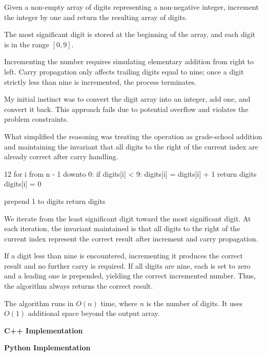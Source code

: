 
\label{prob:lc-066-plus-one}

\ProblemSummary
Given a non-empty array of digits representing a non-negative integer, increment
the integer by one and return the resulting array of digits.

The most significant digit is stored at the beginning of the array, and each
digit is in the range \([0,9]\).

\KeyIdea
Incrementing the number requires simulating elementary addition from right to
left. Carry propagation only affects trailing digits equal to nine; once a
digit strictly less than nine is incremented, the process terminates.

\begin{Thinking}
My initial instinct was to convert the digit array into an integer, add one, and
convert it back. This approach fails due to potential overflow and violates the
problem constraints.

What simplified the reasoning was treating the operation as grade-school
addition and maintaining the invariant that all digits to the right of the
current index are already correct after carry handling.
\end{Thinking}

\Algorithm
\begin{CodeBlock}[style=pseudo,caption={Pseudocode}]{12}
for i from n - 1 downto 0:
    if digits[i] < 9:
        digits[i] = digits[i] + 1
        return digits
    digits[i] = 0

prepend 1 to digits
return digits
\end{CodeBlock}

\Correctness
We iterate from the least significant digit toward the most significant digit.
At each iteration, the invariant maintained is that all digits to the right of
the current index represent the correct result after increment and carry
propagation.

If a digit less than nine is encountered, incrementing it produces the correct
result and no further carry is required. If all digits are nine, each is set to
zero and a leading one is prepended, yielding the correct incremented number.
Thus, the algorithm always returns the correct result.

\Complexity
The algorithm runs in \(O(n)\) time, where \(n\) is the number of digits. It uses
\(O(1)\) additional space beyond the output array.

\bigskip
\noindent\textbf{C++ Implementation}



\bigskip
\noindent\textbf{Python Implementation}



\ProblemDivider
